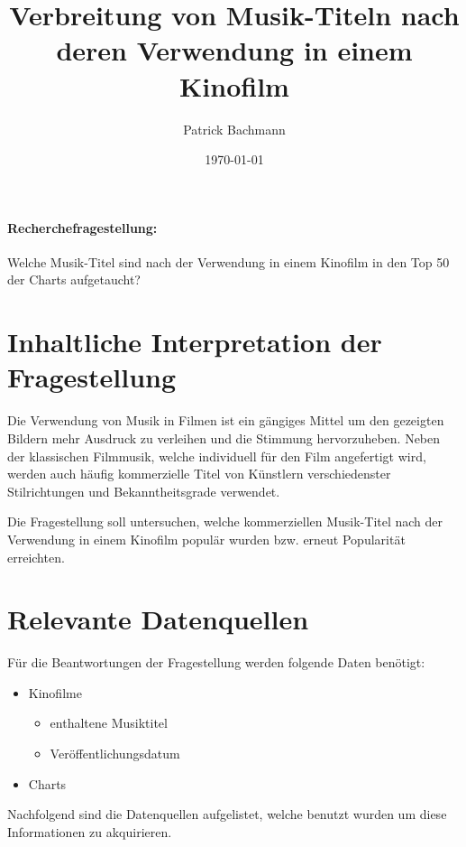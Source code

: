 \documentclass[parskip]{scrartcl}
\begin{document}
\subject{Projektdokumentation im Modul Semantic Web}
\title{Verbreitung von Musik-Titeln nach deren Verwendung in einem Kinofilm}
\author{Patrick Bachmann}
\date{\today}

\maketitle


\paragraph{Recherchefragestellung: }
Welche Musik-Titel sind nach der Verwendung in einem Kinofilm in den Top 50 der Charts aufgetaucht?

\section{Inhaltliche Interpretation der Fragestellung}

Die Verwendung von Musik in Filmen ist ein gängiges Mittel um den gezeigten Bildern mehr Ausdruck zu verleihen und die Stimmung hervorzuheben. Neben der klassischen Filmmusik, welche individuell für den Film angefertigt wird, werden auch häufig kommerzielle Titel von Künstlern verschiedenster Stilrichtungen und Bekanntheitsgrade verwendet.

Die Fragestellung soll untersuchen, welche kommerziellen Musik-Titel nach der Verwendung in einem Kinofilm populär wurden bzw. erneut Popularität erreichten.

\pagebreak
\section{Relevante Datenquellen}

Für die Beantwortungen der Fragestellung werden folgende Daten benötigt:
\begin{itemize}
    \itemsep 1pt
    \parskip 0pt
    \parsep 0pt
    \item Kinofilme
    \begin{itemize}
            \item enthaltene Musiktitel
            \item Veröffentlichungsdatum
    \end{itemize}
        \item Charts
\end{itemize}

Nachfolgend sind die Datenquellen aufgelistet, welche benutzt wurden um diese Informationen zu akquirieren.
\end{document}
